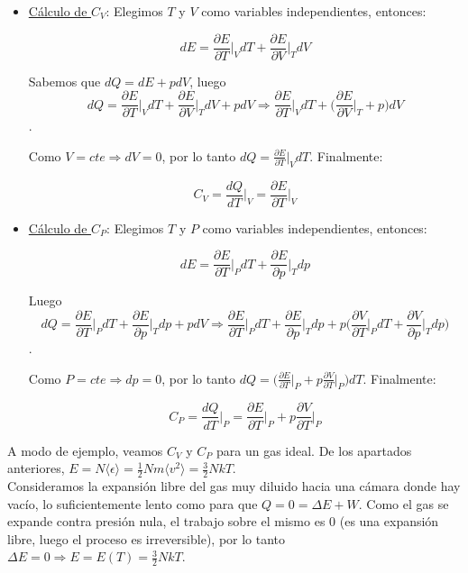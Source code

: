\documentclass[a4paper]{article}
\begin{document}
\begin{itemize}
\item \underline{C\'alculo de $C_{V}$}: Elegimos $T$ y $V$ como variables independientes, entonces:

$$dE = \frac{\partial E}{\partial T}\bigg|_{V}dT + \frac{\partial E}{\partial V}\bigg|_{T}dV $$

Sabemos que $dQ = dE + pdV$, luego $$dQ = \frac{\partial E}{\partial T}\bigg|_{V}dT + \frac{\partial E}{\partial V}\bigg|_{T}dV + pdV \Rightarrow \frac{\partial E}{\partial T}\bigg|_{V}dT + \bigg(\frac{\partial E}{\partial V}\bigg|_{T} + p\bigg)dV$$.

Como $V = cte \Rightarrow dV = 0$, por lo tanto $dQ = \frac{\partial E}{\partial T}\bigg|_{V}dT$. Finalmente:

\begin{equation}
\label{eq:cv}
C_{V} = \frac{dQ}{dT}\bigg|_{V} = \frac{\partial E}{\partial T}\bigg|_{V}
\end{equation}

\item \underline{C\'alculo de $C_{P}$}: Elegimos $T$ y $P$ como variables independientes, entonces:

$$dE = \frac{\partial E}{\partial T}\bigg|_{P}dT + \frac{\partial E}{\partial p}\bigg|_{T}dp $$

Luego $$dQ = \frac{\partial E}{\partial T}\bigg|_{P}dT + \frac{\partial E}{\partial p}\bigg|_{T}dp + pdV \Rightarrow \frac{\partial E}{\partial T}\bigg|_{P}dT + \frac{\partial E}{\partial p}\bigg|_{T}dp + p\bigg(\frac{\partial V}{\partial T}\bigg|_{P}dT + \frac{\partial V}{\partial p}\bigg|_{T}dp\bigg)$$.

Como $P = cte \Rightarrow dp = 0$, por lo tanto $dQ = \bigg(\frac{\partial E}{\partial T}\bigg|_{P} + p \frac{\partial V}{\partial T}\bigg|_{P} \bigg)dT$. Finalmente:

\begin{equation}
\label{eq:cp}
C_{P} = \frac{dQ}{dT}\bigg|_{P} = \frac{\partial E}{\partial T}\bigg|_{P} + p \frac{\partial V}{\partial T}\bigg|_{P}
\end{equation}
\end{itemize}

A modo de ejemplo, veamos $C_{V}$ y $C_{P}$ para un gas ideal. De los apartados anteriores, $E = N\langle \epsilon \rangle = \frac{1}{2}Nm\langle v^{2} \rangle = \frac{3}{2}NkT$.\\

Consideramos la expansi\'on libre del gas muy diluido hacia una c\'amara donde hay vac\'io, lo suficientemente lento como para que $Q = 0 = \Delta E + W$. Como el gas se expande contra presi\'on nula, el trabajo sobre el mismo es 0 (es una expansi\'on libre, luego el proceso es irreversible), por lo tanto $\Delta E = 0 \Rightarrow E = E(T) = \frac{3}{2}NkT$. \\
\end{document}
